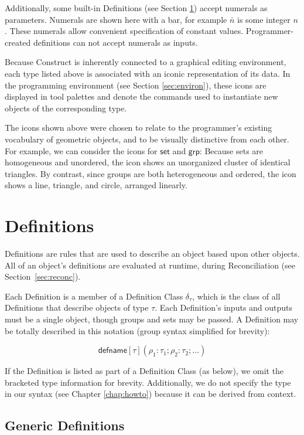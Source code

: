 \documentclass[twoside,11pt]{report}
\begin{document}
Additionally, some built-in Definitions (see Section \ref{sec:def}) accept numerals as parameters. 
Numerals are shown here with a bar, for example $\bar{n}$ is some integer $n$.
These numerals allow convenient specification of constant values. 
Programmer-created definitions can not accept numerals as inputs. 

Because Construct is inherently connected to a graphical editing environment, each type listed above is associated with an iconic representation of its data.
In the programming environment (see Section \ref{sec:environ}), these icons are displayed in tool palettes and denote the commands used to instantiate new objects of the corresponding type.

The icons shown above were chosen to relate to the programmer's existing vocabulary of geometric objects, and to be visually distinctive from each other. 
For example, we can consider the icons for $\mathsf{set}$ and $\mathsf{grp}$: Because sets are homogeneous and unordered, the icon shows an unorganized cluster of identical triangles. 
By contrast, since groups are both heterogeneous and ordered, the icon shows a line, triangle, and circle, arranged linearly.

\section{Definitions}
\label{sec:def}

Definitions are rules that are used to describe an object based upon other objects. 
All of an object's definitions are evaluated at runtime, during Reconciliation (see Section~\ref{sec:reconc}). 

Each Definition is a member of a Definition Class $\delta_\tau$, which is the class of all Definitions that describe objects of type $\tau$. 
Each Definition's inputs and outputs must be a single object, though groups and sets may be passed.
A Definition may be totally described in this notation (group syntax simplified for brevity): 

$$\mathsf{defname}[\tau](\rho_1 : \tau_1; \rho_2 : \tau_2; \dots)$$

If the Definition is listed as part of a Definition Class (as below), we omit the bracketed type information for brevity. 
Additionally, we do not specify the type in our syntax (see Chapter \ref{chap:howto}) because it can be derived from context.

\subsection{Generic Definitions}
\label{subsec:def-gen}
\end{document}

